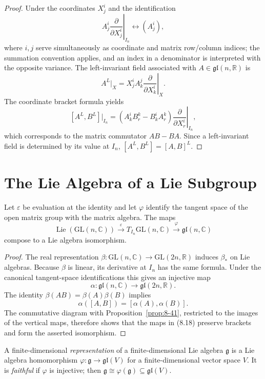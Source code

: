 \begin{proof}
\leanok
\sketch Under the coordinates $X_j^i$ and the identification
\[
\left.A_j^i\frac{\partial}{\partial X_j^i}\right|_{I_n}
\longleftrightarrow (A_j^i),
\]
where $i,j$ serve simultaneously as coordinate and matrix row/column indices;
the summation convention applies, and an index in a denominator is interpreted
with the opposite variance.
The left-invariant field associated with $A\in\mathfrak{gl}(n,\mathbb{R})$ is
\[
A^L|_X=\left.X_j^iA_k^j\frac{\partial}{\partial X_k^i}\right|_X. \tag{8.15}
\]
The coordinate bracket formula yields
\[
[A^L,B^L]|_{I_n}
=\left(A_k^iB_r^k-B_k^iA_r^k\right)
 \left.\frac{\partial}{\partial X_r^i}\right|_{I_n},
\]
which corresponds to the matrix commutator $AB-BA$. Since a left-invariant
field is determined by its value at $I_n$, $[A^L,B^L]=[A,B]^L$.
\end{proof}

\section{The Lie Algebra of a Lie Subgroup}

\begin{proposition}
\label{prop:8-48}
\leanok
{}
Let $\varepsilon$ be evaluation at the identity and let $\varphi$ identify the
tangent space of the open matrix group with the matrix algebra. The maps
\[
\operatorname{Lie}(\mathrm{GL}(n,\mathbb{C}))
\xrightarrow{\ \varepsilon\ }
T_{I_n}\mathrm{GL}(n,\mathbb{C})
\xrightarrow{\ \varphi\ }
\mathfrak{gl}(n,\mathbb{C}) \tag{8.18}
\]
compose to a Lie algebra isomorphism.
\end{proposition}

\begin{proof}
\leanok
\sketch The real representation
$\beta\colon\mathrm{GL}(n,\mathbb{C})\to\mathrm{GL}(2n,\mathbb{R})$ induces
$\beta_* $ on Lie algebras. Because $\beta$ is linear, its derivative at
$I_n$ has the same formula. Under the canonical tangent-space identifications
this gives an injective map
\[
\alpha\colon\mathfrak{gl}(n,\mathbb{C})
\longrightarrow\mathfrak{gl}(2n,\mathbb{R}).
\]
The identity $\beta(AB)=\beta(A)\beta(B)$ implies
\[
\alpha([A,B])=[\alpha(A),\alpha(B)].
\]
The commutative diagram with Proposition~\ref{prop:8-41}, restricted to the
images of the vertical maps, therefore shows that the maps in (8.18) preserve
brackets and form the asserted isomorphism.
\end{proof}

\begin{definition}
\label{def:8-62-extra-1}
\mathlibok
A finite-dimensional \emph{representation} of a finite-dimensional Lie
algebra $\mathfrak g$ is a Lie algebra homomorphism
$\varphi\colon\mathfrak g\to\mathfrak{gl}(V)$ for a finite-dimensional vector
space $V$. It is \emph{faithful} if $\varphi$ is injective; then
$\mathfrak g\cong\varphi(\mathfrak g)\subseteq\mathfrak{gl}(V)$.
\end{definition}
